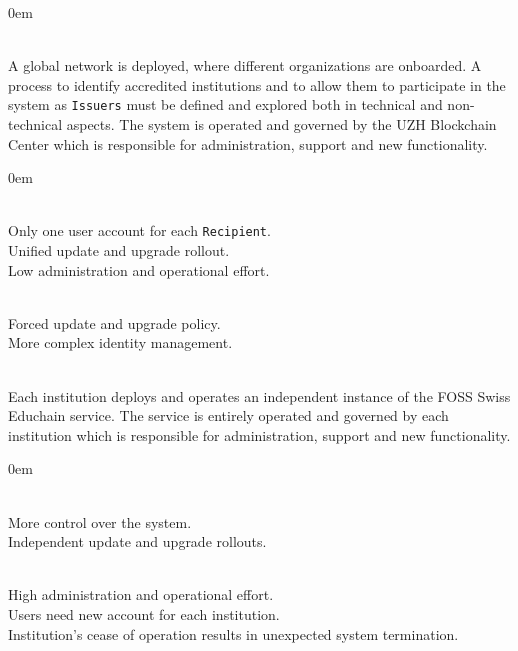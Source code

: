 \begin{description}
	\itemsep0em
	\item[Option 1: Global Network] \hfill \\
	A global network is deployed, where different organizations are onboarded. A process to identify accredited institutions and to allow them to participate in the system as \texttt{Issuers} must be defined and explored both in technical and non-technical aspects. The system is operated and governed by the UZH Blockchain Center which is responsible for administration, support and new functionality.
	
	\begin{description}
		\itemsep0em
		\item[Advantages] \hfill \\
		Only one user account for each \texttt{Recipient}. \hfill \\
		Unified update and upgrade rollout. \hfill \\
		Low administration and operational effort.	 \hfill 
		\item[Disadvantages] \hfill \\
		Forced update and upgrade policy. \hfill \\
		More complex identity management. \hfill 		
	\end{description}
	
	\item [Option 2: Per-institution Network] \hfill \\ 
	Each institution deploys and operates an independent instance of the FOSS Swiss Educhain service. The service is entirely operated and governed by each institution which is responsible for administration, support and new functionality.
	
	\begin{description}
		\itemsep0em
		\item[Advantages] \hfill \\
		More control over the system. \hfill \\
		Independent update and upgrade rollouts. \hfill 
		
		\item[Disadvantages] \hfill \\
		High administration and operational effort. \hfill \\
		Users need new account for each institution. \hfill \\
		Institution's cease of operation results in unexpected system termination. \hfill 
	\end{description}
\end{description}

